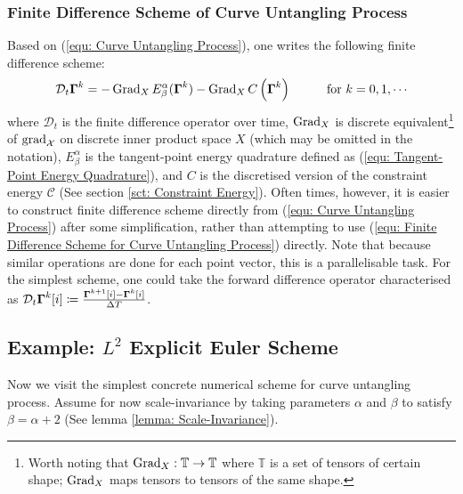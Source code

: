 \documentclass[../dissertation.tex]{subfiles}
\begin{document}
\subsubsection{Finite Difference Scheme of Curve Untangling Process}
Based on (\ref{equ: Curve Untangling Process}), one writes the following finite difference scheme:
\begin{equation}
    \mathcal{D}_{t} \Gammabf^{k} = -\Grad_{X} E_{\beta}^{\alpha} (\Gammabf^k) - \Grad_{X} C \left( \Gammabf^k \right) \hspace{1cm} \text{for } k=0,1,\cdots
    \label{equ: Finite Difference Scheme for Curve Untangling Process}
\end{equation}
where $\mathcal{D}_t$ is the finite difference operator over time,
$\operatorname{Grad}_{X}$ is discrete equivalent\footnote{Worth noting that $\operatorname{Grad}_X:\mathbb{T} \rightarrow \mathbb{T}$ where $\mathbb{T}$ is a set of tensors of certain shape; $\operatorname{Grad}_X$ maps tensors to tensors of the same shape.}  of $\operatorname{grad}_{\mathcal{X}}$ on discrete inner product space $X$ (which may be omitted in the notation),
$E_{\beta}^{\alpha}$ is the tangent-point energy quadrature defined as (\ref{equ: Tangent-Point Energy Quadrature}),
and $C$ is the discretised version of the constraint energy $\mathcal{C}$ (See section \ref{sct: Constraint Energy}).
Often times, however, it is easier to construct finite difference scheme directly from (\ref{equ: Curve Untangling Process}) after some simplification,
rather than attempting to use (\ref{equ: Finite Difference Scheme for Curve Untangling Process}) directly.
Note that because similar operations are done for each point vector, this is a parallelisable task.
For the simplest scheme, one could take the forward difference operator characterised as $\mathcal{D}_t \boldsymbol{\Gamma}^k[i] \coloneqq \frac{\boldsymbol{\Gamma}^{k+1}[i] - \boldsymbol{\Gamma}^{k}[i]}{\Delta T}$.

\subsection{Example: $L^2$ Explicit Euler Scheme}
Now we visit the simplest concrete numerical scheme for curve untangling process.
Assume for now scale-invariance by taking parameters $\alpha$ and $\beta$ to satisfy $\beta = \alpha+2$ (See lemma \ref{lemma: Scale-Invariance}).
\end{document}
